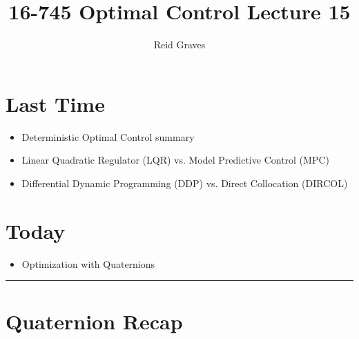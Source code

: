 \documentclass[11pt]{article}
\title{16-745 Optimal Control Lecture 15}
\author{Reid Graves}
\begin{document}
\maketitle


\section{Last Time}
\begin{itemize}
    \item Deterministic Optimal Control summary
    \item Linear Quadratic Regulator (LQR) vs. Model Predictive Control (MPC)
    \item Differential Dynamic Programming (DDP) vs. Direct Collocation (DIRCOL)
\end{itemize}

\section{Today}
\begin{itemize}
    \item Optimization with Quaternions
\end{itemize}

\noindent\rule{\textwidth}{0.4pt} %

\section*{Quaternion Recap}
\end{document}
